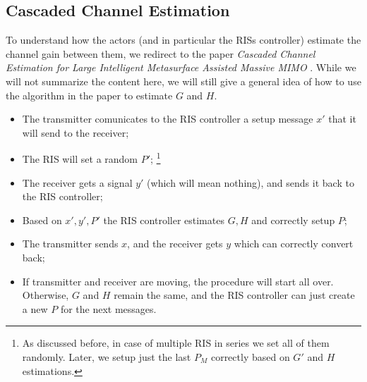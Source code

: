 \subsection{Cascaded Channel Estimation}
To understand how the actors (and in particular the RISs controller) estimate the channel gain between them, we redirect to the paper \textit{Cascaded Channel Estimation for Large Intelligent Metasurface Assisted Massive MIMO} \cite{8879620}. While we will not summarize the content here, we will still give a general idea of how to use the algorithm in the paper to estimate $G$ and $H$.
\begin{itemize}
  \item The transmitter comunicates to the RIS controller a setup message $x'$ that it will send to the receiver;
  \item The RIS will set a random $P'$; \footnote{As discussed before, in case of multiple RIS in series we set all of them randomly. Later, we setup just the last $P_M$ correctly based on $G'$ and $H$ estimations.}
  \item The receiver gets a signal $y'$ (which will mean nothing), and sends it back to the RIS controller;
  \item Based on $x', y', P'$ the RIS controller estimates $G, H$ and correctly setup $P$;
  \item The transmitter sends $x$, and the receiver gets $y$ which can correctly convert back;
  \item If transmitter and receiver are moving, the procedure will start all over. Otherwise, $G$ and $H$ remain the same, and the RIS controller can just create a new $P$ for the next messages.
\end{itemize}